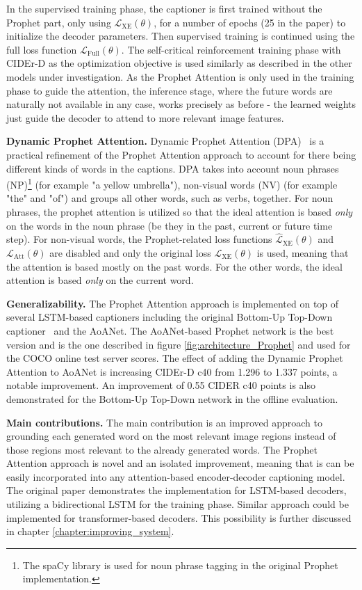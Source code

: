 \documentclass[english,twoside,openright]{HYgraduMLDS}
\begin{document}
In the supervised training phase, the captioner is first trained without the Prophet part, only using $\mathcal{L}_{\text{XE}}(\theta)$, for a number of epochs (25 in the paper) to initialize the decoder parameters. Then supervised training is continued using the full loss function $\mathcal{L}_{\text{Full}}(\theta)$. The self-critical reinforcement training phase with CIDEr-D as the optimization objective is used similarly as described in the other models under investigation. As the Prophet Attention is only used in the training phase to guide the attention, the inference stage, where the future words are naturally not available in any case, works precisely as before - the learned weights just guide the decoder to attend to more relevant image features. 

\textbf{Dynamic Prophet Attention.} Dynamic Prophet Attention (DPA)~\cite{Prophet} is a practical refinement of the Prophet Attention approach to account for there being different kinds of words in the captions. DPA takes into account noun phrases (NP)\footnote{The spaCy library is used for noun phrase tagging in the original Prophet implementation.} (for example "a yellow umbrella"), non-visual words (NV) (for example "the" and "of") and groups all other words, such as verbs, together. For noun phrases, the prophet attention is utilized so that the ideal attention is based \textit{only} on the words in the noun phrase (be they in the past, current or future time step). For non-visual words, the Prophet-related loss functions $\hat{\mathcal{L}}_{\text{XE}}(\theta)$ and $\mathcal{L}_{\text{Att}}(\theta)$ are disabled and only the original loss $\mathcal{L}_{\text{XE}}(\theta)$ is used, meaning that the attention is based mostly on the past words. For the other words, the ideal attention is based \textit{only} on the current word.

\textbf{Generalizability.} The Prophet Attention approach is implemented on top of several LSTM-based captioners including the original Bottom-Up Top-Down captioner~\cite{BottomUp} and the AoANet. The AoANet-based Prophet network is the best version and is the one described in figure \ref{fig:architecture_Prophet} and used for the COCO online test server scores. The effect of adding the Dynamic Prophet Attention to AoANet is increasing CIDEr-D c40 from 1.296 to 1.337 points, a notable improvement. An improvement of 0.55 CIDER c40 points is also demonstrated for the Bottom-Up Top-Down network in the offline evaluation.

\textbf{Main contributions.} The main contribution is an improved approach to grounding each generated word on the most relevant image regions instead of those regions most relevant to the already generated words. The Prophet Attention approach is novel and an isolated improvement, meaning that is can be easily incorporated into any attention-based encoder-decoder captioning model. The original paper demonstrates the implementation for LSTM-based decoders, utilizing a bidirectional LSTM for the training phase. Similar approach could be implemented for transformer-based decoders. This possibility is further discussed in chapter \ref{chapter:improving_system}.
\end{document}
